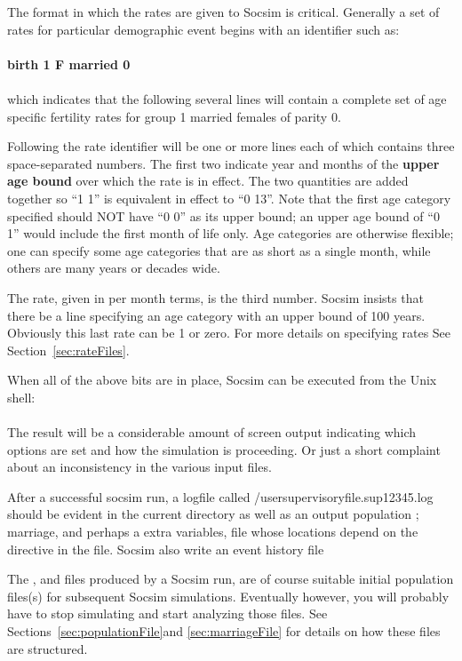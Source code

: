 \begin{description}
The format in which the rates are given
  to Socsim is critical. Generally a set of rates for particular
  demographic event begins with an identifier such as:\\
\\
\textbf{birth 1 F married 0 }\\
\\
which indicates that the following several lines will contain a
complete set of age specific fertility rates for group 1 married
females of parity 0. 

Following the rate identifier will be one or more lines each of which
contains three space-separated numbers. The first two indicate year and
months of the \textbf{upper age bound} over which the rate is in
effect. The two quantities are added together so ``1 1'' is equivalent
in effect to ``0 13''.  Note that the first age category specified
should NOT have ``0 0'' as its upper bound; an upper age bound of ``0
1'' would include the first month of life only.  Age categories are
otherwise flexible;  one can specify some age categories that are as
short as a single month, while others are many years or decades wide.

The rate, given in per month terms, is the third number. Socsim
insists that there be a line specifying an age category with an upper
bound of 100 years. Obviously this last rate can be 1 or zero.  For
more details on specifying rates See Section~\ref{sec:rateFiles}.
\end{description}

When all of the above bits are in place, Socsim can be executed from
the Unix shell:\\

\\

The result will be a considerable amount of screen output indicating
which options are set and how the simulation is proceeding. Or just a
short complaint about an inconsistency in the various input files.

After a successful socsim run, a logfile called
/user{supervisoryfile.sup12345.log} should be evident in the current
directory as well as an output population ; marriage,
 and perhaps a extra variables,  file whose
locations depend on the  directive in the
 file.  Socsim also write an event history file


The ,  and  files produced by a
Socsim run, are of course suitable initial population files(s) for
subsequent Socsim simulations.  Eventually however, you will probably
have to stop simulating and start analyzing those files.  See
Sections~\ref{sec:populationFile}and \ref{sec:marriageFile} for
details on how these files are structured.

